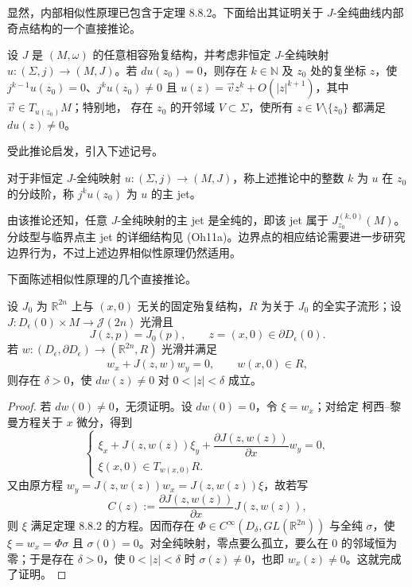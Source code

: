 显然，内部相似性原理已包含于定理 8.8.2。下面给出其证明关于
$J$-全纯曲线内部奇点结构的一个直接推论。
\begin{corollary}\label{cor:ch8-critical-point-expansion}
设 $J$ 是 $(M,\omega)$ 的任意相容殆复结构，并考虑非恒定
$J$-全纯映射 $u:(\Sigma,j)\to(M,J)$。若 $du(z_0)=0$，则存在
$k\in\mathbb N$ 及 $z_0$ 处的复坐标 $z$，使
$j^{k-1}u(z_0)=0$、$j^ku(z_0)\ne0$ 且
$u(z)=\vec v z^k+O(|z|^{k+1})$，其中 $\vec v\in T_{u(z_0)}M$；特别地，
存在 $z_0$ 的开邻域 $V\subset\Sigma$，使所有 $z\in V\setminus\{z_0\}$
都满足 $du(z)\ne0$。
\end{corollary}
受此推论启发，引入下述记号。
\begin{definition}\label{def:ch8-ramification-order-principal-jet}
对于非恒定 $J$-全纯映射 $u:(\Sigma,j)\to(M,J)$，称上述推论中的整数
$k$ 为 $u$ 在 $z_0$ 的分歧阶，称 $j^ku(z_0)$ 为 $u$ 的主 jet。
\end{definition}
由该推论还知，任意 $J$-全纯映射的主 jet 是全纯的，即该 jet 属于
$J^{(k,0)}_{z_0}(M)$。分歧型与临界点主 jet 的详细结构见 (Oh11a)。边界点的相应结论需要进一步研究边界行为，不过上述边界相似性原理仍然适用。

下面陈述相似性原理的几个直接推论。
\begin{proposition}\label{prop:ch8-boundary-critical-isolated}
设 $J_0$ 为 $\mathbb R^{2n}$ 上与 $(x,0)$ 无关的固定殆复结构，$R$ 为关于
$J_0$ 的全实子流形；设
$J:D_\epsilon(0)\times M\to\mathcal J(2n)$ 光滑且
\begin{equation}J(z,p)=J_0(p),\qquad z=(x,0)\in\partial D_\epsilon(0).\label{eq:ch8-boundary-independent-j}\end{equation}
若 $w:(D_\epsilon,\partial D_\epsilon)\to(\mathbb R^{2n},R)$ 光滑并满足
\begin{equation}w_x+J(z,w)w_y=0,\qquad w(x,0)\in R,\label{eq:ch8-boundary-nonlinear-cr}\end{equation}
则存在 $\delta>0$，使 $dw(z)\ne0$ 对 $0<|z|<\delta$ 成立。
\end{proposition}
\begin{proof}
若 $dw(0)\ne0$，无须证明。设 $dw(0)=0$，令 $\xi=w_x$；对给定
柯西--黎曼方程关于 $x$ 微分，得到
\[
 \begin{cases}
 \xi_x+J(z,w(z))\xi_y+\dfrac{\partial J(z,w(z))}{\partial x}w_y=0,\\
 \xi(x,0)\in T_{w(x,0)}R.
 \end{cases}
\]
又由原方程 $w_y=J(z,w(z))w_x=J(z,w(z))\xi$，故若写
\[
 C(z):=\frac{\partial J(z,w(z))}{\partial x}J(z,w(z)),
\]
则 $\xi$ 满足定理 8.8.2 的方程。因而存在
$\Phi\in C^\infty(D_\delta,GL(\mathbb R^{2n}))$ 与全纯 $\sigma$，使
$\xi=w_x=\Phi\sigma$ 且 $\sigma(0)=0$。对全纯映射，零点要么孤立，要么在
$0$ 的邻域恒为零；于是存在 $\delta>0$，使 $0<|z|<\delta$ 时
$\sigma(z)\ne0$，也即 $w_x(z)\ne0$。这就完成了证明。
\end{proof}

